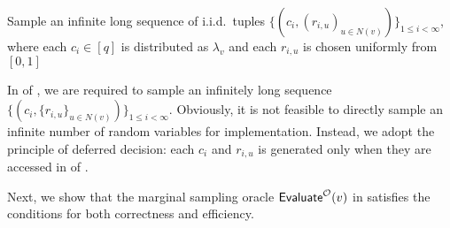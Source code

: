 
\begin{algorithm}[H]
\caption{$\eval^{\+O}(v)$} \label{Alg:eval}
 Sample an infinite long sequence of i.i.d.~tuples $\{(c_i,(r_{i,u})_{u\in N(v)})\}_{1\leq i<\infty}$, where
    each $c_i\in [q]$ is distributed as $\lambda_v$ and each $r_{i,u}$ is chosen uniformly from $[0,1]$\;\label{Line:eval-sample}
\For{$i=1,2,...$\label{Line:reject}}{
${flag} \gets 1$\;
\For{$e=(u,v)\in E$\label{Line:eval-for}}{
\If{$r_{i,u}\geq \lb$\label{Line:eval-cond}}{
\lIf{$r_{i,u}\geq A_{e}(\+O(u),c_i)$\label{Line:eval-if}}{${flag} \gets 0$}
}
}
\lIf{${flag}=1$\label{Line:eval-return}}{\Return $c_i$}
}
\end{algorithm}


\begin{remark}\label{remark:lazy-samples}
    In  of , we are required to sample an infinitely long sequence $\{(c_i,\{r_{i,u}\}_{u\in N(v)})\}_{1\leq i<\infty}$. 
    Obviously, it is not feasible to directly sample an infinite number of random variables for implementation.  
    Instead, we adopt the principle of deferred decision: each $c_i$ and $r_{i,u}$ is generated only when they are accessed in   of . 
\end{remark}

Next, we show that the marginal sampling oracle $\eval^{\+O}(v)$ in  satisfies the conditions for both correctness and efficiency. 

